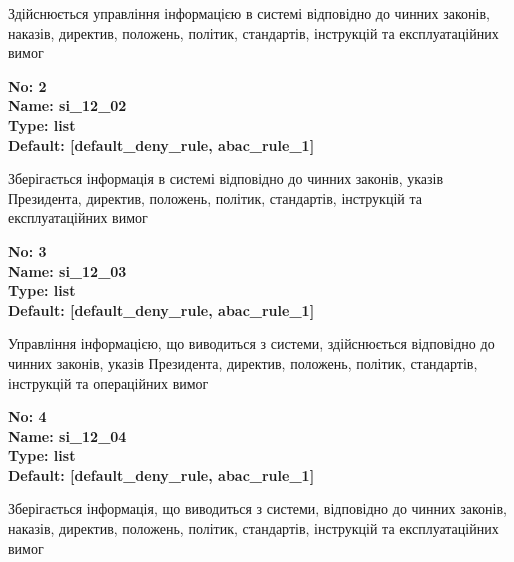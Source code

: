 \documentclass{article}
\begin{document}
{\footnotesize Здійснюється управління інформацією в системі відповідно до чинних законів, наказів, директив, положень, політик, стандартів, інструкцій та експлуатаційних вимог}


{\footnotesize\bfseries
No: 2\\
Name: si\_\allowbreak{}12\_\allowbreak{}02\\
Type: list\\
Default: [\textquotedbl{}default\_\allowbreak{}deny\_\allowbreak{}rule\textquotedbl{}, \textquotedbl{}abac\_\allowbreak{}rule\_\allowbreak{}1\textquotedbl{}]
}

{\footnotesize Зберігається інформація в системі відповідно до чинних законів, указів Президента, директив, положень, політик, стандартів, інструкцій та експлуатаційних вимог}


{\footnotesize\bfseries
No: 3\\
Name: si\_\allowbreak{}12\_\allowbreak{}03\\
Type: list\\
Default: [\textquotedbl{}default\_\allowbreak{}deny\_\allowbreak{}rule\textquotedbl{}, \textquotedbl{}abac\_\allowbreak{}rule\_\allowbreak{}1\textquotedbl{}]
}

{\footnotesize Управління інформацією, що виводиться з системи, здійснюється відповідно до чинних законів, указів Президента, директив, положень, політик, стандартів, інструкцій та операційних вимог}


{\footnotesize\bfseries
No: 4\\
Name: si\_\allowbreak{}12\_\allowbreak{}04\\
Type: list\\
Default: [\textquotedbl{}default\_\allowbreak{}deny\_\allowbreak{}rule\textquotedbl{}, \textquotedbl{}abac\_\allowbreak{}rule\_\allowbreak{}1\textquotedbl{}]
}

{\footnotesize Зберігається інформація, що виводиться з системи, відповідно до чинних законів, наказів, директив, положень, політик, стандартів, інструкцій та експлуатаційних вимог}
\end{document}
